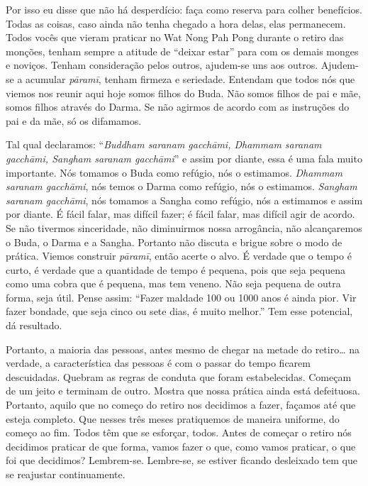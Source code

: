 Por isso eu disse que não há desperdício: faça como reserva para
colher benefícios. Todas as coisas, caso ainda não tenha chegado a hora
delas, elas permanecem. Todos vocês que vieram praticar no Wat Nong Pah
Pong durante o retiro das monções, tenham sempre a atitude de “deixar
estar” para com os demais monges e noviços. Tenham consideração pelos
outros, ajudem-se uns aos outros. Ajudem-se a acumular
\textit{pāramī}, tenham firmeza e seriedade. Entendam que todos
nós que viemos nos reunir aqui hoje somos filhos do Buda. Não somos
filhos de pai e mãe, somos filhos através do Darma. Se não agirmos de
acordo com as instruções do pai e da mãe, só os difamamos. 

Tal qual declaramos: “\textit{Buddham saranam gacchāmi, Dhammam
saranam gacchāmi, Sangham saranam gacchāmi}” e assim por diante,
essa é uma fala muito importante. Nós tomamos o Buda como refúgio, nós
o estimamos. \textit{Dhammam saranam gacchāmi}, nós temos o Darma
como refúgio, nós o estimamos. \textit{Sangham saranam gacchāmi}, nós
tomamos a Sangha como refúgio, nós a estimamos e assim por diante. É
fácil falar, mas difícil fazer; é fácil falar, mas difícil agir de
acordo. Se não tivermos sinceridade, não diminuirmos nossa arrogância,
não alcançaremos o Buda, o Darma e a Sangha. Portanto não discuta e
brigue sobre o modo de prática. Viemos construir \textit{pāramī},
então acerte o alvo. É verdade que o tempo é curto, é verdade que a
quantidade de tempo é pequena, pois que seja pequena como uma cobra que
é pequena, mas tem veneno. Não seja pequena de outra forma, seja útil.
Pense assim: “Fazer maldade 100 ou 1000 anos é ainda pior. Vir fazer
bondade, que seja cinco ou sete dias, é muito melhor.” Tem esse
potencial, dá resultado. 

Portanto, a maioria das pessoas, antes mesmo de chegar na metade do
retiro… na verdade, a característica das pessoas é com o passar do
tempo ficarem descuidadas. Quebram as regras de conduta que foram
estabelecidas. Começam de um jeito e terminam de outro. Mostra que
nossa prática ainda está defeituosa. Portanto, aquilo que no começo do
retiro nos decidimos a fazer, façamos até que esteja completo. Que
nesses três meses pratiquemos de maneira uniforme, do começo ao fim.
Todos têm que se esforçar, todos. Antes de começar o retiro nós
decidimos praticar de que forma, vamos fazer o que, como vamos
praticar, o que foi que decidimos? Lembrem-se. Lembre-se, se estiver
ficando desleixado tem que se reajustar continuamente.

